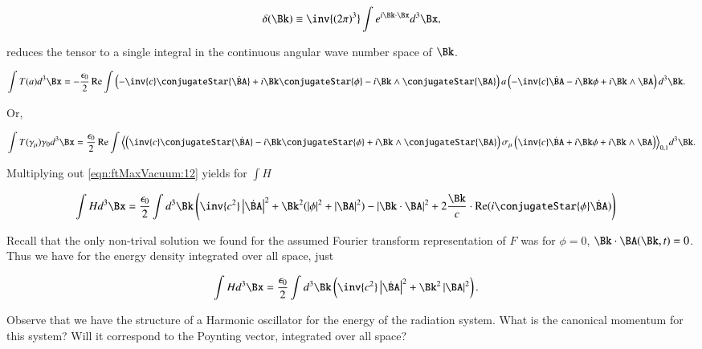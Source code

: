 \begin{align}
\label{eqn:ftMaxVacuum:9}
\delta(\Bk) \equiv \inv{(2 \pi)^3} \int e^{i \Bk \cdot \Bx} d^3 \Bx,
\end{align}

reduces the tensor to a single integral in the continuous angular wave number space of $\Bk$.

\begin{align}
\label{eqn:ftMaxVacuum:10}
\int T(a) d^3 \Bx &= -\frac{\epsilon_0}{2} \Real \int
\left(
- \inv{c} \conjugateStar{\dot{\BA}}
+ i \Bk \conjugateStar{\phi}
- i \Bk \wedge \conjugateStar{\BA}
\right)
a
\left(
- \inv{c} \dot{\BA}
- i \Bk \phi
+ i \Bk \wedge \BA
\right)
d^3 \Bk.
\end{align}

Or,

\begin{align}
\label{eqn:ftMaxVacuum:12}
\int T(\gamma_\mu) \gamma_0 d^3 \Bx =
\frac{\epsilon_0}{2} \Real \int
\gpgrade{
\left(
\inv{c} \conjugateStar{\dot{\BA}}
- i \Bk \conjugateStar{\phi}
+ i \Bk \wedge \conjugateStar{\BA}
\right)
\sigma_\mu
\left(
\inv{c} \dot{\BA}
+ i \Bk \phi
+ i \Bk \wedge \BA
\right)
}{0,1}
d^3 \Bk.
\end{align}


Multiplying out \autoref{eqn:ftMaxVacuum:12} yields for $\int H$

\begin{align}
\label{eqn:ftMaxVacuum:14}
\int H d^3 \Bx &=
\frac{\epsilon_0}{2} \int d^3 \Bk \left(
\inv{c^2} \Abs{\dot{\BA}}^2 + \Bk^2 (\Abs{\phi}^2 + \Abs{\BA}^2 )
- \Abs{\Bk \cdot \BA}^2
+ 2 \frac{\Bk}{c} \cdot \Real( i \conjugateStar{\phi} \dot{\BA} )
\right)
\end{align}

Recall that the only non-trival solution we found for the assumed Fourier transform representation of $F$ was for $\phi = 0$, $\Bk \cdot \BA(\Bk, t) = 0$.  Thus we have for the energy density integrated over all space, just

\begin{align}
\label{eqn:ftMaxVacuum:14b}
\int H d^3 \Bx &=
\frac{\epsilon_0}{2} \int d^3 \Bk \left(
\inv{c^2} \Abs{\dot{\BA}}^2 + \Bk^2 \Abs{\BA}^2 
\right).
\end{align}

Observe that we have the structure of a Harmonic oscillator for the energy of the radiation system.  What is the canonical momentum for this system?  Will it correspond to the Poynting vector, integrated over all space?

